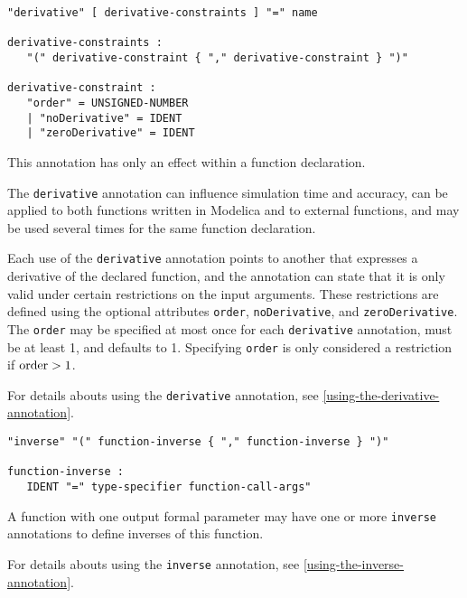 \begin{annotationdefinition}[derivative]
\begin{synopsis}[grammar]\begin{lstlisting}
"derivative" [ derivative-constraints ] "=" name

derivative-constraints :
   "(" derivative-constraint { "," derivative-constraint } ")"

derivative-constraint :
   "order" = UNSIGNED-NUMBER
   | "noDerivative" = IDENT
   | "zeroDerivative" = IDENT
\end{lstlisting}\end{synopsis}
\begin{semantics}
This annotation has only an effect within a function declaration.

The {\lstinline!derivative!} annotation can influence simulation time and accuracy, can be applied to both functions written in Modelica and to external functions, and may be used several times for the same function declaration.

Each use of the {\lstinline!derivative!} annotation points to another  that expresses a derivative of the declared function, and the annotation can state that it is only valid under certain restrictions on the input arguments.
These restrictions are defined using the optional attributes {\lstinline!order!}, {\lstinline!noDerivative!}, and {\lstinline!zeroDerivative!}.
The {\lstinline!order!} may be specified at most once for each {\lstinline!derivative!} annotation, must be at least 1, and defaults to 1.
Specifying {\lstinline!order!} is only considered a restriction if $\text{{\lstinline!order!}} > 1$.

For details abouts using the {\lstinline!derivative!} annotation, see \cref{using-the-derivative-annotation}.
\end{semantics}
\end{annotationdefinition}

\begin{annotationdefinition}[inverse]
\begin{synopsis}[grammar]\begin{lstlisting}
"inverse" "(" function-inverse { "," function-inverse } ")"

function-inverse :
   IDENT "=" type-specifier function-call-args"
\end{lstlisting}\end{synopsis}
\begin{semantics}
A function with one output formal parameter may have one or more {\lstinline!inverse!} annotations to define inverses of this function.

For details abouts using the {\lstinline!inverse!} annotation, see \cref{using-the-inverse-annotation}.
\end{semantics}
\end{annotationdefinition}


